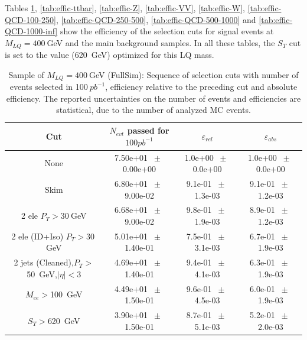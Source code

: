 Tables  
\ref{tab:effic-MLQ400}, 
\ref{tab:effic-ttbar}, 
\ref{tab:effic-Z}, 
\ref{tab:effic-VV},
\ref{tab:effic-W},
\ref{tab:effic-QCD-100-250},
\ref{tab:effic-QCD-250-500},
\ref{tab:effic-QCD-500-1000} and
\ref{tab:effic-QCD-1000-inf}
show the efficiency of the selection cuts for signal events at $M_{LQ}=400~$GeV and the main background samples.
In all these tables, the $S_T$ cut is set to the value (620~GeV) optimized for this LQ mass.  

\begin{table}[htbp] 
\begin{center} 
\begin{tabular}{|c|c|c|c|} 
\hline\hline 
 Cut & $N_{evt}$ passed for $100pb^{-1}$ & $\varepsilon_{rel}$ & $\varepsilon_{abs}$ \\ 
\hline\hline 
None       &        7.50e+01       $~\pm~$       0.00e+00        &        1.0e+00       $~\pm~$       0.0e+00        &        1.0e+00       $~\pm~$       0.0e+00       \\       
       Skim       &        6.80e+01       $~\pm~$       9.00e-02        &        9.1e-01       $~\pm~$       1.3e-03        &        9.1e-01       $~\pm~$       1.2e-03       \\       
       2 ele $P_T>30~$GeV       &        6.68e+01       $~\pm~$       9.00e-02        &        9.8e-01       $~\pm~$       1.9e-03        &        8.9e-01       $~\pm~$       1.2e-03       \\       
       2 ele (ID+Iso) $P_T>30~$GeV       &        5.01e+01       $~\pm~$       1.40e-01        &        7.5e-01       $~\pm~$       3.1e-03        &        6.7e-01       $~\pm~$       1.9e-03       \\       
       2 jets (Cleaned),$P_T>$50~GeV,$|\eta|<$3       &        4.69e+01       $~\pm~$       1.40e-01        &        9.4e-01       $~\pm~$       4.1e-03        &        6.3e-01       $~\pm~$       1.9e-03       \\       
       $M_{ee}>$100~GeV       &        4.49e+01       $~\pm~$       1.50e-01        &        9.6e-01       $~\pm~$       4.5e-03        &        6.0e-01       $~\pm~$       1.9e-03       \\       
       $S_T>$620~GeV       &        3.90e+01       $~\pm~$       1.50e-01        &        8.7e-01       $~\pm~$       5.1e-03        &        5.2e-01       $~\pm~$       2.0e-03       \\       
          \hline\hline 
\end{tabular} 
\end{center} 
\caption{Sample of $M_{LQ}=400~$GeV (FullSim): Sequence of selection cuts with number of events selected in 100$~pb^{-1}$, efficiency relative to the preceding cut and absolute efficiency. The reported uncertainties on the number of events and efficiencies are statistical, due to the number of analyzed MC events.} 
\label{tab:effic-MLQ400} 
\end{table} 

